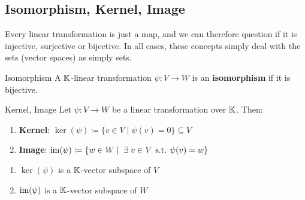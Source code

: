 \subsection{Isomorphism, Kernel, Image}
Every linear transformation is just a map, and we can therefore question if it is injective, surjective or bijective. In all cases, these concepts simply deal with the sets (vector spaces) as simply sets.

\begin{definition} {Isomorphism}
    A \(\mathbb{K}\)-linear transformation \(\psi: V \to W\) is an \textbf{isomorphism} if it is bijective.
\end{definition}

\begin{definition} {Kernel, Image}
    Let \(\psi: V \to W\) be a linear transformation over \(\mathbb{K}\). Then: \begin{enumerate}
        \item \textbf{Kernel}: \(\ker(\psi) \coloneqq \{v \in V \mid \psi(v) = 0\} \subseteq V\)
        \item \textbf{Image}: \(\im(\psi) \coloneqq \{w \in W \mid \exists v \in V \st \psi(v) = w\}\)
    \end{enumerate}
\end{definition}

\begin{lemma}
    \begin{enumerate}
        \item \(\ker(\psi)\) is a \(\mathbb{K}\)-vector subspace of \(V\)
        \item \(\mathrm{im}(\psi)\) is a \(\mathbb{K}\)-vector subspace of \(W\)
    \end{enumerate}
\end{lemma}

